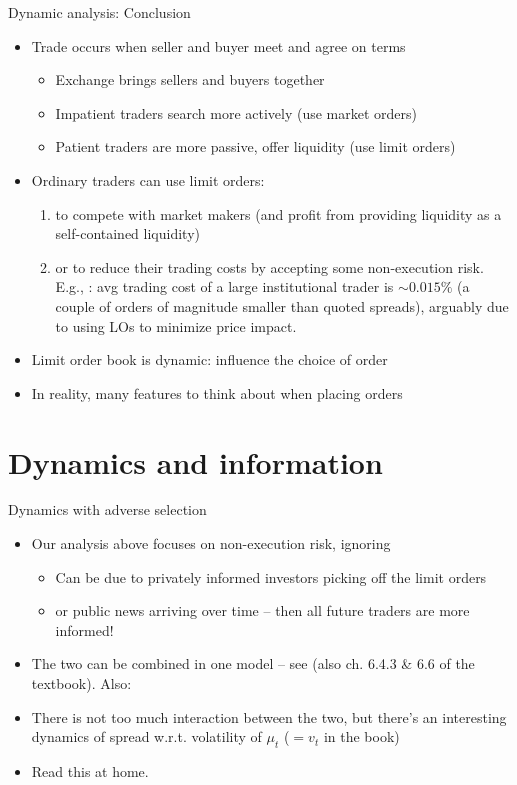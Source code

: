 \documentclass[english,10pt
,aspectratio=169
]{beamer}
\begin{document}
\begin{frame}[label=parlourmain]{Dynamic analysis: Conclusion}
\begin{itemize}
	\item Trade occurs when seller and buyer meet and agree on terms
	\begin{itemize}
		\item Exchange brings sellers and buyers together
		\item Impatient traders search more actively (use market orders)
		\item Patient traders are more passive, offer liquidity (use limit orders)
	\end{itemize}
	\item Ordinary traders can use limit orders:
	\begin{enumerate}
		\item to compete with market makers (and profit from providing liquidity as a self-contained liquidity)
		\item or to reduce their trading costs by accepting some non-execution risk. E.g., \citet*{frazzini_trading_2018}: avg trading cost of a large institutional trader is $\sim 0.015\%$ (a couple of orders of magnitude smaller than quoted spreads), arguably due to using LOs to minimize price impact.
	\end{enumerate}
	\item Limit order book is dynamic: influence the choice of order
	\item In reality, many features to think about when placing orders
\end{itemize}
\end{frame}



\section{Dynamics and information}

\begin{frame}{Dynamics with adverse selection}
	\begin{itemize}
		\item Our analysis above focuses on non-execution risk, ignoring 
		\begin{itemize}
			\item Can be due to privately informed investors picking off the limit orders
			\item or \alert{public news} arriving over time -- then all future traders are more informed!
		\end{itemize}
		\item The two can be combined in one model -- see \cite{foucault_order_1999} (also ch. 6.4.3 \& 6.6 of the textbook). Also: \hyperlink{adverse}{}
		\item There is not too much interaction between the two, but there's an interesting dynamics of spread w.r.t. volatility of $\mu_t$ ($=v_t$ in the book)
		\item Read this at home.
	\end{itemize}
\end{frame}
\end{document}

